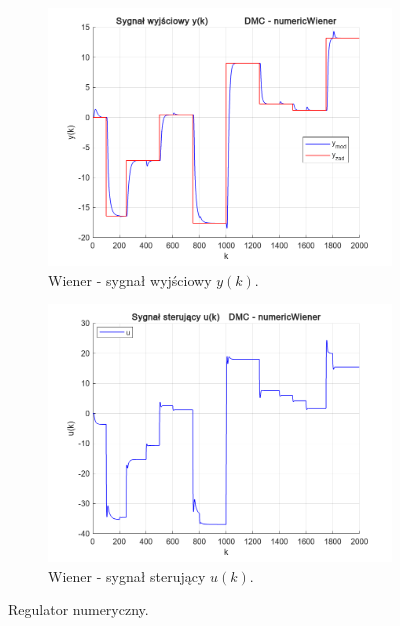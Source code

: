 \begin{figure}[b!]
\begin{subfigure}[b]{0.49\paperwidth}
\centering
\includegraphics[width=\linewidth]{pictures/y_numericWiener}
\caption{Wiener - sygnał wyjściowy $y(k)$.}
\end{subfigure}
\hfill
\begin{subfigure}[b]{0.49\paperwidth}
\centering
\includegraphics[width=\linewidth]{pictures/u_numericWiener}
\caption{Wiener - sygnał sterujący $u(k)$.}
\end{subfigure}

\caption{Regulator numeryczny.}
\end{figure}

\newpage

